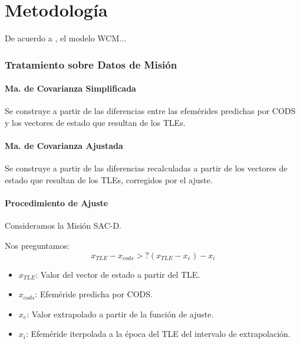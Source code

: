 \chapter{Metodología}
\label{chap:metodologia}

 De acuerdo a \cite{Barrett2009}, el modelo WCM...\\


\subsection{Tratamiento sobre Datos de Misi\'on}

\subsubsection{Ma. de Covarianza Simplificada}
Se construye a partir de las diferencias entre las efem\'erides predichas por CODS y los vectores de estado que resultan de los TLEs.\\


\subsubsection{Ma. de Covarianza Ajustada}
Se construye a partir de las diferencias recalculadas a partir de los vectores de estado que resultan de los TLEs, corregidos por el ajuste.\\


\subsubsection{Procedimiento de Ajuste}
Consideramos la Misi\'on SAC-D.

Nos preguntamos:\\
\begin{equation}
 x_{TLE}-x_{cods} > ? (x_{TLE}-x_{e})-x_{i}
\end{equation}
\begin{itemize}
 \item $x_{TLE}$: Valor del vector de estado a partir del TLE.\\
 \item $x_{cods}$: Efem\'eride predicha por CODS.\\
 \item $x_{e}$: Valor extrapolado a partir de la funci\'on de ajuste.\\
 \item $x_{i}$: Efem\'eride iterpolada a la \'epoca del TLE del intervalo de extrapolaci\'on.\\
\end{itemize}


